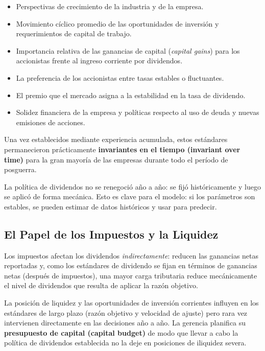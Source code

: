 \documentclass[12pt]{article}
\begin{document}
\begin{itemize}
  \item Perspectivas de crecimiento de la industria y de la empresa.
  \item Movimiento c\'iclico promedio de las oportunidades de inversi\'on y requerimientos
        de capital de trabajo.
  \item Importancia relativa de las ganancias de capital (\textit{capital gains}) para
        los accionistas frente al ingreso corriente por dividendos.
  \item La preferencia de los accionistas entre tasas estables o fluctuantes.
  \item El premio que el mercado asigna a la estabilidad en la tasa de dividendo.
  \item Solidez financiera de la empresa y pol\'iticas respecto al uso de deuda y
        nuevas emisiones de acciones.
\end{itemize}

Una vez establecidos mediante experiencia acumulada, estos est\'andares permanecieron
pr\'acticamente \textbf{invariantes en el tiempo (invariant over time)} para la gran mayor\'ia
de las empresas durante todo el per\'iodo de posguerra.

\begin{intuicion}
La pol\'itica de dividendos no se renegoci\'o a\~no a a\~no: se fij\'o hist\'oricamente
y luego se aplic\'o de forma mec\'anica. Esto es clave para el modelo: si los par\'ametros
son estables, se pueden estimar de datos hist\'oricos y usar para predecir.
\end{intuicion}

\subsection{El Papel de los Impuestos y la Liquidez}

Los impuestos afectan los dividendos \textit{indirectamente}: reducen las ganancias netas
reportadas y, como los est\'andares de dividendo se fijan en t\'erminos de ganancias netas
(despu\'es de impuestos), una mayor carga tributaria reduce mec\'anicamente el nivel de
dividendos que resulta de aplicar la raz\'on objetivo.

La posici\'on de liquidez y las oportunidades de inversi\'on corrientes influyen en los
est\'andares de largo plazo (raz\'on objetivo y velocidad de ajuste) pero rara vez
intervienen directamente en las decisiones a\~no a a\~no. La gerencia planifica su
\textbf{presupuesto de capital (capital budget)} de modo que llevar a cabo la pol\'itica de
dividendos establecida no la deje en posiciones de iliquidez severa.
\end{document}

